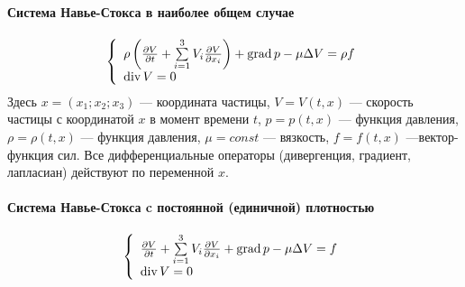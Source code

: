 \paragraph{Система Навье-Стокса в наиболее общем случае}
$$
	\left\{
		\begin{array}{l}
		\rho\left(
			\frac{\partial V}{\partial t}+\sum\limits_{i=1}^{3}V_i\frac{\partial V}{\partial x_i}
		\right) + \operatorname{grad} p - \mu \Delta V = \rho f
		\\
		\operatorname{div} V = 0
		\end{array}
	\right.
$$
Здесь
$x = (x_1; x_2; x_3)$ --- координата частицы,
$V = V(t,x)$ --- скорость частицы с координатой $x$ в момент времени $t$,
$p = p(t,x)$ --- функция давления,
$\rho = \rho(t,x)$ --- функция давления,
$\mu = const$ --- вязкость,
$f = f(t,x)$ ---вектор-функция сил.
Все дифференциальные операторы (дивергенция, градиент, лапласиан)
действуют по переменной $x$.

\paragraph{Система Навье-Стокса c постоянной (единичной) плотностью}
$$
	\left\{
		\begin{array}{l}
		\frac{\partial V}{\partial t}+\sum\limits_{i=1}^{3}V_i\frac{\partial V}{\partial x_i}
		+ \operatorname{grad} p - \mu \Delta V = f
		\\
		\operatorname{div} V = 0
		\end{array}
	\right.
$$
